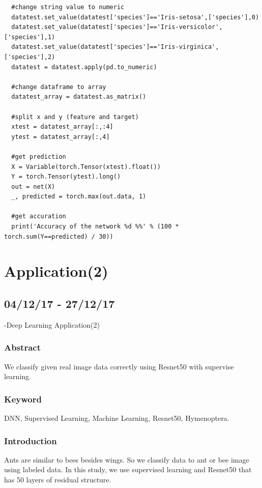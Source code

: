 \documentclass{article}
\begin{document}
\begin{CJK}{UTF8}{}
\begin{verbatim}
  #change string value to numeric
  datatest.set_value(datatest['species']=='Iris-setosa',['species'],0)
  datatest.set_value(datatest['species']=='Iris-versicolor',['species'],1)
  datatest.set_value(datatest['species']=='Iris-virginica',['species'],2)
  datatest = datatest.apply(pd.to_numeric)

  #change dataframe to array
  datatest_array = datatest.as_matrix()

  #split x and y (feature and target)
  xtest = datatest_array[:,:4]
  ytest = datatest_array[:,4]

  #get prediction
  X = Variable(torch.Tensor(xtest).float())
  Y = torch.Tensor(ytest).long()
  out = net(X)
  _, predicted = torch.max(out.data, 1)

  #get accuration
  print('Accuracy of the network %d %%' % (100 * torch.sum(Y==predicted) / 30))
\end{verbatim}

\newline\newline\newline

\section{Application(2)}
\subsection{04/12/17 - 27/12/17}
-Deep Learning Application(2)\newline\newline
\subsubsection{Abstract}
We classify given real image data correctly using Resnet50 with supervise learning.
\subsubsection{Keyword}
DNN, Supervised Learning, Machine Learning, Resnet50, Hymenoptera.

\subsubsection{Introduction}
Ants are similar to bees besides wings. So we classify data to ant or bee image using labeled data. In this study, we use supervised learning and Resnet50 that has 50 layers of residual structure.


\end{CJK}
\end{document}
